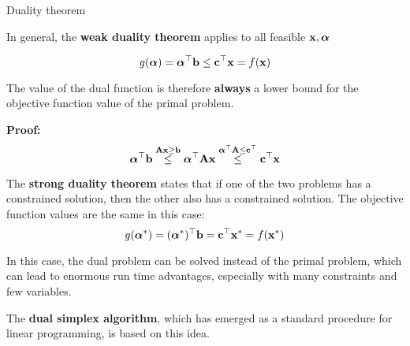\documentclass[11pt,compress,t,notes=noshow, xcolor=table]{beamer}
\begin{document}
\begin{vbframe}{Duality theorem}

In general, the \textbf{weak duality theorem} applies to all feasible $\mathbf{x}, \bm{\alpha}$

$$
g(\bm{\alpha}) = \bm{\alpha}^\top\mathbf{b} \le \mathbf{c}^\top\mathbf{x}  = f(\mathbf{x})
$$

The value of the dual function is therefore \textbf{always} a lower bound for the objective function value of the primal problem.

\lz

\textbf{Proof:}
\begin{equation*}
    \bm{\alpha}^\top\mathbf{b} \overset{\mathbf{A} \mathbf{x} \ge \mathbf{b}}{\le}\bm{\alpha}^\top\mathbf{A} \mathbf{x} \overset{\bm{\alpha}^\top\mathbf{A} \le \mathbf{c}^\top}{\le}\mathbf{c}^\top\mathbf{x}
\end{equation*}

\framebreak

The \textbf{strong duality theorem} states that if one of the two problems has a constrained solution, then the other also has a constrained solution. The objective function values are the same in this case:
\begin{equation*}
    g(\bm{\alpha}^*) = (\bm{\alpha}^*)^\top\mathbf{b} = \mathbf{c}^\top\mathbf{x}^* = f(\mathbf{x}^*)
\end{equation*}

In this case, the dual problem can be solved instead of the primal problem, which can lead to enormous run time advantages, especially with many constraints and few variables.

\lz

The \textbf{dual simplex algorithm}, which has emerged as a standard procedure for linear programming, is based on this idea.

\end{vbframe}
\end{document}
